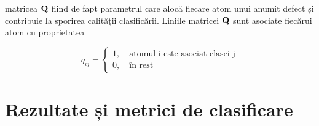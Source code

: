 matricea $\mathbf{Q}$ fiind de fapt parametrul care alocă fiecare atom unui anumit defect și contribuie la sporirea calității clasificării. Liniile matricei $\mathbf{Q}$ sunt asociate fiecărui atom cu proprietatea

\begin{equation}
    q_{ij} = \begin{cases}
    1,\quad \text{atomul i este asociat clasei j} \\
    0,\quad  \text{în rest}
    \end{cases}
\end{equation}





\section{Rezultate și metrici de clasificare}
